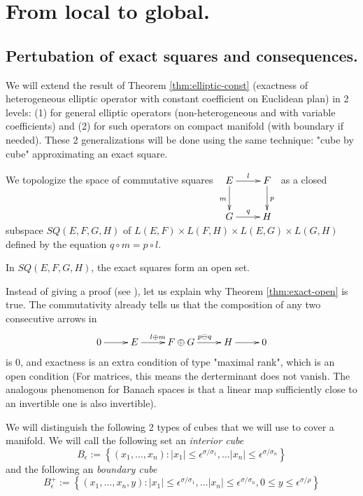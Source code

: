 \section{From local to global.}
\label{sec:org7498191}
\subsection{Pertubation of exact squares and consequences.}
\label{sec:orgfa2fb3e}
We will extend the result of Theorem \ref{thm:elliptic-const} (exactness of heterogeneous elliptic
operator with constant coefficient on Euclidean plan) in 2 levels: (1) for general
elliptic operators (non-heterogeneous and with variable coefficients) and (2) for such
operators on compact manifold (with boundary if needed). These 2 generalizations will be
done using the same technique: "cube by cube" approximating an exact square.

We topologize the space of commutative squares \(\xymatrix{
E \ar@{->}[r]^{l} \ar@{->}[d]_{m} & F \ar@{->}[d]^{p} \\
G \ar@{->}[r]^{q} & H
}\) as a closed subspace \(SQ(E,F,G,H)\) of \(L(E,F)\times L(F,H)\times L(E,G)\times L(G,H)\) defined
by the equation \(q\circ m = p\circ l\).

\begin{theorem}
\label{thm:exact-open}
In \(SQ(E,F,G,H)\), the exact squares form an open set.
\end{theorem}

Instead of giving a proof (see \cite[page 75-77]{hamilton_harmonic_1975}), let us explain why Theorem \ref{thm:exact-open} is true. The
commutativity already tells us that the composition of any two consecutive arrows in
\[
 \xymatrix{
0 \ar@{->}[r] & E \ar@{->}[r]^{l\oplus m} & F\oplus G \ar@{->}[r]^{p\ominus q} & H \ar@{->}[r] & 0
}
\]
is 0, and exactness is an extra condition of type "maximal rank", which is an open
condition (For matrices, this means the derterminant does not vanish. The analogous
phenomenon for Banach spaces is that a linear map sufficiently close to an invertible one
is also invertible).


We will distinguish the following 2 types of cubes that we will use to cover a
manifold. We will call the following set an \emph{interior cube}
\[ 
B_\epsilon := \left\{ (x_1,\dots,
x_n): |x_1|\leq\epsilon^{\sigma/\sigma_1},\dots |x_n|
\leq\epsilon^{\sigma/\sigma_n}\right\} 
\]
and the following an \emph{boundary cube}
\[ 
B^+_\epsilon := \left\{ (x_1,\dots,
x_n,y): |x_1|\leq\epsilon^{\sigma/\sigma_1},\dots |x_n|
\leq\epsilon^{\sigma/\sigma_n}, 0\leq y\leq \epsilon^{\sigma/\rho}\right\} 
\]

